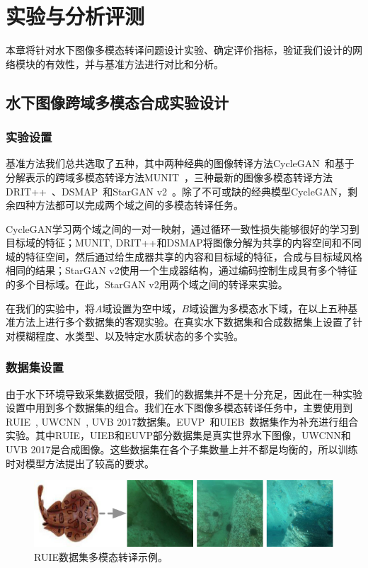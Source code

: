 \chapter{实验与分析评测}
本章将针对水下图像多模态转译问题设计实验、确定评价指标，验证我们设计的网络模块的有效性，并与基准方法进行对比和分析。

\section{水下图像跨域多模态合成实验设计}
\subsection{实验设置}
基准方法我们总共选取了五种，其中两种经典的图像转译方法CycleGAN~\citep{zhu2017unpaired}和基于分解表示的跨域多模态转译方法MUNIT~\citep{huang2018multimodal}，三种最新的图像多模态转译方法DRIT++~\citep{lee2020drit++}、DSMAP~\citep{chang2020domain}和StarGAN v2~\cite{choi2020stargan}。除了不可或缺的经典模型CycleGAN，剩余四种方法都可以完成两个域之间的多模态转译任务。

CycleGAN学习两个域之间的一对一映射，通过循环一致性损失能够很好的学习到目标域的特征；MUNIT, DRIT++和DSMAP将图像分解为共享的内容空间和不同域的特征空间，然后通过给生成器共享的内容和目标域的特征，合成与目标域风格相同的结果；StarGAN v2使用一个生成器结构，通过编码控制生成具有多个特征的多个目标域。在此，StarGAN v2用两个域之间的转译来实验。

在我们的实验中，将$A$域设置为空中域，$B$域设置为多模态水下域，在以上五种基准方法上进行多个数据集的客观实验。在真实水下数据集和合成数据集上设置了针对模糊程度、水类型、以及特定水质状态的多个实验。

\subsection{数据集设置}
由于水下环境导致采集数据受限，我们的数据集并不是十分充足，因此在一种实验设置中用到多个数据集的组合。我们在水下图像多模态转译任务中，主要使用到RUIE~\citep{liu2019real}, UWCNN~\citep{li2020underwater}, UVB 2017数据集。EUVP~\citep{islam2019fast}和UIEB~\citep{li2019underwater}数据集作为补充进行组合实验。其中RUIE，UIEB和EUVP部分数据集是真实世界水下图像，UWCNN和UVB 2017是合成图像。这些数据集在各个子集数量上并不都是均衡的，所以训练时对模型方法提出了较高的要求。

\begin{figure}[htp]
    \centering
	\includegraphics[width=\textwidth]{figures/ruie-dataset.pdf}
	\caption{RUIE数据集多模态转译示例。}
	\label{fig:ruie_dataset}
\end{figure}

